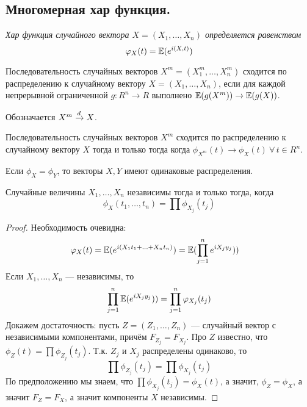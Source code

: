 \subsection{Многомерная хар функция.}
\begin{definition}
    \it{Хар функция} случайного вектора $X = (X_1, \ldots, X_n)$ определяется равенством
    \[
        \varphi_X(t) = \mathbb{E}(e^{i(X, t)})
    \]
\end{definition}
\begin{definition}
    Последовательность случайных векторов $X^m = (X_1^m, \ldots, X_n^m)$ сходится по распределению
    к случайному вектору $X = (X_1, \ldots, X_n)$, если для каждой непрерывной ограниченной $g \colon R^n \to R$
    выполнено $\mathbb{E}(g(X^m)) \to \mathbb{E}(g(X))$.

    Обозначается $X^m \xrightarrow{d} X$.
\end{definition}
\begin{theorem}
    Последовательность случайных векторов $X^m$ сходится по распределению к случайному вектору $X$ тогда и только
    тогда когда $\phi_{X^m}(t) \to \phi_X(t) \: \forall\, t \in R^n$.
\end{theorem}
\begin{corollary}
    Если $\phi_X = \phi_Y$, то векторы $X, Y$ имеют одинаковые распределения.
\end{corollary}
\begin{corollary}
    Случайные величины $X_{1}, \ldots, X_n$ независимы тогда и только тогда, когда
    \[
        \phi_X(t_1, \ldots, t_n) = \prod \phi_{X_j}(t_j)
    \]
\end{corollary}
\begin{proof}
    Необходимость очевидна:
    \begin{align*}
        \varphi_X(t) &= \mathbb{E}(e^{i(X_1t_1 + \ldots + X_nt_n)}) = \mathbb{E}(\prod_{j = 1}^n e^{iX_{j}y_j}))
    \end{align*}
    Если $X_1, \ldots, X_n$ --- независимы, то
    \[
        \prod_{j = 1}^n\mathbb{E}(e^{iX_{j}y_j})) = \prod_{j = 1}^n \varphi_{X_j}(t_j)
    \]
    Докажем достаточность: пусть $Z = (Z_1, \ldots, Z_n)$ --- случайный вектор с независимыми компонентами,
    причём $F_{Z_j} = F_{X_j}$. Про $Z$ известно, что $\phi_Z(t) = \prod \phi_{Z_j}(t_j)$. Т.к. $Z_j$ и
    $X_j$ распределены одинаково, то
    \[
        \prod \phi_{Z_j}(t_j) = \prod \phi_{X_j}(t_j)
    \]
    По предположению мы знаем, что $\prod \phi_{X_j}(t_j) = \phi_X(t)$, а значит, $\phi_Z = \phi_X$,
    а значит $F_Z = F_X$, а значит компоненты $X$ независимы.
\end{proof}
